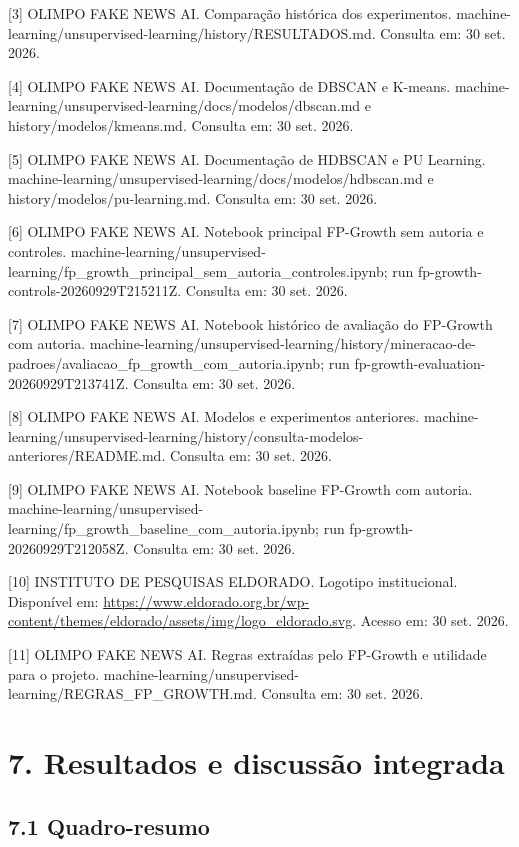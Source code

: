 \documentclass[
  brazilian,
  11pt,
]{article}
\begin{document}
{[}3{]} OLIMPO FAKE NEWS AI. Comparação histórica dos experimentos. machine-learning/unsupervised-learning/history/RESULTADOS.md. Consulta em: 30 set. 2026.

{[}4{]} OLIMPO FAKE NEWS AI. Documentação de DBSCAN e K-means. machine-learning/unsupervised-learning/docs/modelos/dbscan.md e history/modelos/kmeans.md. Consulta em: 30 set. 2026.

{[}5{]} OLIMPO FAKE NEWS AI. Documentação de HDBSCAN e PU Learning. machine-learning/unsupervised-learning/docs/modelos/hdbscan.md e history/modelos/pu-learning.md. Consulta em: 30 set. 2026.

{[}6{]} OLIMPO FAKE NEWS AI. Notebook principal FP-Growth sem autoria e controles. machine-learning/unsupervised-learning/fp\_growth\_principal\_sem\_autoria\_controles.ipynb; run fp-growth-controls-20260929T215211Z. Consulta em: 30 set. 2026.

{[}7{]} OLIMPO FAKE NEWS AI. Notebook histórico de avaliação do FP-Growth com autoria. machine-learning/unsupervised-learning/history/mineracao-de-padroes/avaliacao\_fp\_growth\_com\_autoria.ipynb; run fp-growth-evaluation-20260929T213741Z. Consulta em: 30 set. 2026.

{[}8{]} OLIMPO FAKE NEWS AI. Modelos e experimentos anteriores. machine-learning/unsupervised-learning/history/consulta-modelos-anteriores/README.md. Consulta em: 30 set. 2026.

{[}9{]} OLIMPO FAKE NEWS AI. Notebook baseline FP-Growth com autoria. machine-learning/unsupervised-learning/fp\_growth\_baseline\_com\_autoria.ipynb; run fp-growth-20260929T212058Z. Consulta em: 30 set. 2026.

{[}10{]} INSTITUTO DE PESQUISAS ELDORADO. Logotipo institucional. Disponível em: \url{https://www.eldorado.org.br/wp-content/themes/eldorado/assets/img/logo_eldorado.svg}. Acesso em: 30 set. 2026.

{[}11{]} OLIMPO FAKE NEWS AI. Regras extraídas pelo FP-Growth e utilidade para o projeto. machine-learning/unsupervised-learning/REGRAS\_FP\_GROWTH.md. Consulta em: 30 set. 2026.

\section{7. Resultados e discussão integrada}\label{resultados-e-discussuxe3o-integrada}

\subsection{7.1 Quadro-resumo}\label{quadro-resumo}
\end{document}
